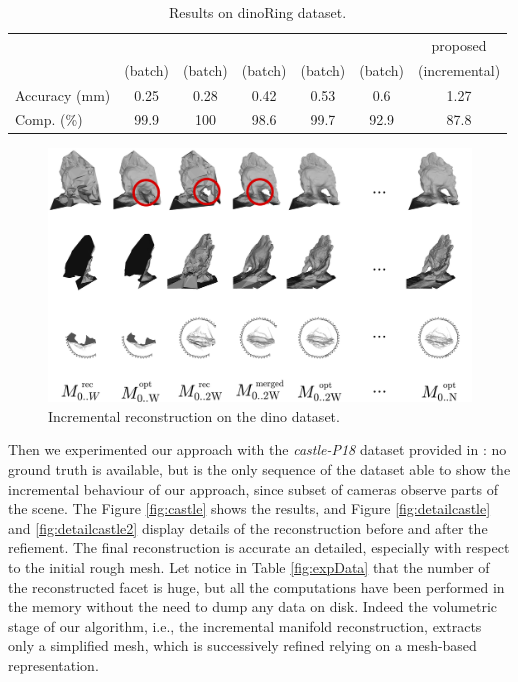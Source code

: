 \begin{table}[t]
\footnotesize
\centering
\setlength{\tabcolsep}{1px}
  \caption{Results on dinoRing dataset.}
  \label{tab:dinoRes}
    \begin{tabular}{lcccccc}
    \hline
    &
    \cite{savinov2016semantic}&
    \cite{li2015detail}&
    \cite{zaharescu2007transformesh}&
    \cite{hiep2009towards}&%
    \cite{gargallo2007minimizing}&proposed\\
    &(batch)&(batch)&(batch)&(batch)&(batch)&%
    (incremental)\\
    Accuracy (mm) &0.25&0.28&0.42&0.53&%
    0.6&1.27\\
    Comp. (\%)&99.9&100&98.6&99.7&%
    92.9&87.8
    \end{tabular}
\end{table}



 \begin{figure}[t]
  \centering
  \includegraphics[width=\textwidth]{./img/ch-incr-dens/dino}
  \caption{Incremental reconstruction on the dino dataset.}
  \label{fig:dinoIncr}
\end{figure}


Then we experimented our approach with the \emph{castle-P18} dataset provided in \cite{strecha2008}: no ground truth is available, but is the only sequence of the dataset able to show the incremental behaviour of our approach, since subset of cameras observe parts of the scene. 
The Figure \ref{fig:castle} shows the results, and Figure \ref{fig:detailcastle} and \ref{fig:detailcastle2} display details of the reconstruction before and after the refiement. The final reconstruction is accurate  an detailed, especially with respect to the initial rough mesh.
Let notice in Table \ref{fig:expData} that the number of the reconstructed facet is huge, but all the computations have been performed in the memory without the need to dump any data on disk. Indeed the volumetric stage of our algorithm, i.e., the incremental manifold reconstruction, extracts only a  simplified mesh, which is successively refined relying on a mesh-based representation.



